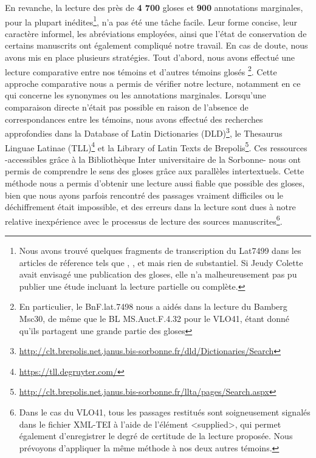 \documentclass[a4paper, twoside, 12pt]{book}
\begin{document}
En revanche, la lecture des près de \textbf{4 700} gloses et \textbf{900} annotations marginales, pour la plupart inédites\footnote{Nous avons trouvé quelques fragments de transcription du Lat7499 dans les articles de réference tels que \cite{jeudy1974manuscrits}, \cite{sabbadini1995opere}, et \cite{lemoine1989symptomes} mais rien de substantiel. Si Jeudy Colette avait envisagé une publication des gloses, elle n'a malheureusement pas pu publier une étude incluant la lecture partielle ou complète.}, n'a pas été une tâche facile. Leur forme concise, leur caractère informel, les abréviations employées, ainsi que l'état de conservation de certains manuscrits ont également compliqué notre travail. En cas de doute, nous avons mis en place plusieurs stratégies. Tout d'abord, nous avons effectué une lecture comparative entre nos témoins et d'autres témoins glosés \footnote{En particulier, le BnF.lat.7498 nous a aidés dans la lecture du Bamberg Msc30, de même que le BL MS.Auct.F.4.32 pour le VLO41, étant donné qu'ils partagent une grande partie des gloses}. Cette approche comparative nous a permis de vérifier notre lecture, notamment en ce qui concerne les synonymes ou les annotations marginales. Lorsqu'une comparaison directe n'était pas possible en raison de l'absence de correspondances entre les témoins, nous avons effectué des recherches approfondies dans la Database of Latin Dictionaries (DLD)\footnote{\url{http://clt.brepolis.net.janus.bis-sorbonne.fr/dld/Dictionaries/Search}}, le Thesaurus Linguae Latinae (TLL)\footnote{\url{https://tll.degruyter.com/}} et la Library of Latin Texts de Brepolis\footnote{\url{http://clt.brepolis.net.janus.bis-sorbonne.fr/llta/pages/Search.aspx}}. Ces ressources -accessibles grâce à la Bibliothèque Inter universitaire de la Sorbonne- nous ont permis de comprendre le sens des gloses grâce aux parallèles intertextuels. Cette méthode nous a permis d'obtenir une lecture aussi fiable que possible des gloses, bien que nous ayons parfois rencontré des passages vraiment difficiles ou le déchiffrement était impossible, et des erreurs dans la lecture sont dues à notre relative inexpérience avec le processus de lecture des sources manuscrites\footnote{Dans le cas du VLO41, tous les passages restitués sont soigneusement signalés dans le fichier XML-TEI à l'aide de l'élément <supplied>, qui permet également d'enregistrer le degré de certitude de la lecture proposée. Nous prévoyons d'appliquer la même méthode à nos deux autres témoins.}. \\
\end{document}
